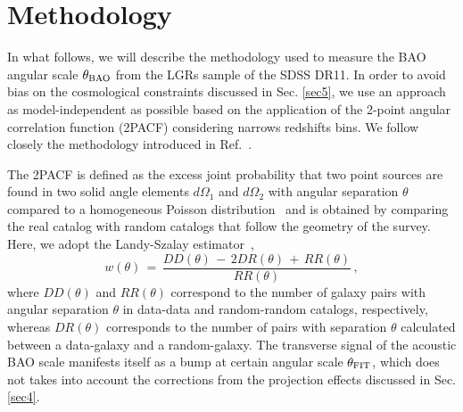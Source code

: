 \documentclass[a4paper,11pt]{article}
\begin{document}
\section{Methodology} 
\label{sec2}

In what follows, we will describe the methodology used to measure the BAO angular scale $\theta_{\rm{BAO}}$ from the LGRs sample of the SDSS DR11. In order to avoid bias on the cosmological constraints  discussed in Sec. \ref{sec5}, we use an approach as model-independent as possible based on the application of the 2-point angular correlation function (2PACF) considering narrows redshifts bins.  We follow closely the methodology introduced in Ref.~\cite{Carvalho}.

The 2PACF is defined as the excess joint probability that two point sources are found in two solid angle elements $d\Omega_1$ and $d\Omega_2$ with angular separation $\theta$ compared to a homogeneous Poisson distribution~\cite{Peebles-Hauser} and is obtained by comparing the real catalog with random catalogs that follow the geometry of the survey. Here, we adopt the Landy-Szalay estimator~\cite{Landy-Szalay}, 
\begin{equation} \label{ls}
w(\theta) \,=\, \frac{DD(\theta) \,-\, 2 DR(\theta) \,+\, RR(\theta)}{RR(\theta)} \, , 
\end{equation}
where $DD(\theta)$ and $RR(\theta)$ correspond to the number of galaxy pairs with angular separation $\theta$ in 
data-data and random-random catalogs, respectively, whereas $DR(\theta)$ corresponds to the number 
of pairs with separation $\theta$ calculated between a data-galaxy and a random-galaxy. The transverse signal of the acoustic BAO scale
manifests itself as a bump at certain angular scale $\theta_{\rm{FIT}}$, which does not takes into account the corrections from the projection effects discussed in Sec. \ref{sec4}.
\end{document}
